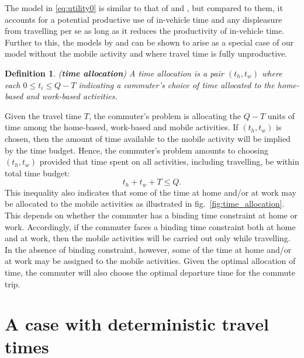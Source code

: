 \documentclass[12pt,a4paper,british]{article}
\newtheorem{definition}{Definition}[section]
\begin{document}
The model in \eqref{eq:utility0} is similar to that of \citet{Oort1969EvaluationTravellingTime} and  \citet{DeSerpa1971TheoryEconomicsTime}, but compared to them, it accounts for a potential productive use of in-vehicle time and any displeasure from travelling per se as long as it reduces the productivity of in-vehicle time. Further to this, the models by \citet{Becker1965TheoryAllocationTime} and \citet{Johnson1966TravelTimePrice} can be shown to arise as a special case of our model without the mobile activity and where travel time is fully unproductive. 




\begin{definition}
	(\textbf{time allocation}) A time allocation is a pair $\left(t_{h},t_{w}\right)$ where each $0\leq t_{i}\leq Q-T$ indicating a commuter's choice of time allocated to the home-based and work-based activities.
\end{definition}

Given the travel time $T$, the commuter's problem is allocating the $Q-T$ units of time among the home-based, work-based and mobile activities. If $\left(t_{h},t_{w}\right)$ is chosen, then the amount of time available to the mobile activity will be implied by the time budget. Hence, the commuter's problem amounts to choosing $\left(t_{h},t_{w}\right)$ provided that time spent on all activities, including travelling, be within total time budget:
\begin{equation}
t_{h}+t_{w}+T\leq Q.
\label{constraint0}
\end{equation}
This inequality also indicates that some of the time at home and/or at work may be allocated to the mobile activities as illustrated in fig.~\ref{fig:time_allocation}. This depends on whether the commuter has a binding time constraint at home or work. Accordingly, if the commuter faces a binding time constraint both at home and at work, then the mobile activities will be carried out only while travelling. In the absence of binding constraint, however, some of the time at home and/or at work may be assigned to the mobile activities. Given the optimal allocation of time, the commuter will also choose the optimal departure time for the commute trip.


\section{A case with deterministic travel times}
\end{document}

